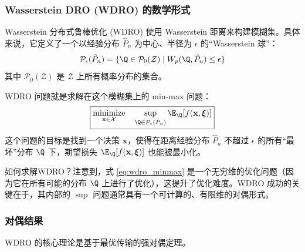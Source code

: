 \documentclass[lang=cn,newtx,10pt,scheme=chinese,chinesefont=nofont,citestyle=gb7714-2015, bibstyle=gb7714-2015]{elegantbook}
\DeclareMathOperator*{\minimize}{minimize}
\newcommand{\bx}{\mathbf{x}} %
\newcommand{\bxi}{\boldsymbol{\xi}} %
\newcommand{\Pcal}{\mathcal{P}} %
\newcommand{\Xcal}{\mathcal{X}} %
\newcommand{\Zcal}{\mathcal{Z}} %
\newcommand{\Phat}{\hat{P}_n} %
\begin{document}
\begin{refsection}
\subsubsection{Wasserstein DRO (WDRO) 的数学形式}

Wasserstein 分布式鲁棒优化 (WDRO) 使用 Wasserstein 距离来构建模糊集。具体来说，它定义了一个以经验分布 $\Phat$ 为中心、半径为 $\epsilon$ 的“Wasserstein 球”：
\begin{equation}
\label{eq:ambiguity_set}
\Pcal_\epsilon(\Phat) = \{ \Q \in \Pcal_0(\Zcal) \mid W_p(\Q, \Phat) \le \epsilon \}
\end{equation}
其中 $\Pcal_0(\Zcal)$ 是 $\Zcal$ 上所有概率分布的集合。

WDRO 问题就是求解在这个模糊集上的 min-max 问题：
\begin{equation}
\label{eq:wdro_minmax}
\boxed{
\minimize_{\bx \in \Xcal} \quad \sup_{\Q \in \Pcal_\epsilon(\Phat)} \E_{\Q}[f(\bx, \bxi)]
}
\end{equation}
这个问题的目标是找到一个决策 $\bx$，使得在距离经验分布 $\Phat$ 不超过 $\epsilon$ 的所有“最坏”分布 $\Q$ 下，期望损失 $\E_{\Q}[f(\bx, \bxi)]$ 也能被最小化。


如何求解WDRO？注意到，式 \eqref{eq:wdro_minmax} 是一个无穷维的优化问题（因为它在所有可能的分布 $\Q$ 上进行了优化），这提升了优化难度。WDRO 成功的关键在于，其内部的 $\sup$ 问题通常具有一个可计算的、有限维的对偶形式。

\subsubsection{对偶结果}
WDRO 的核心理论是基于最优传输的强对偶定理。


\end{refsection}
\end{document}
